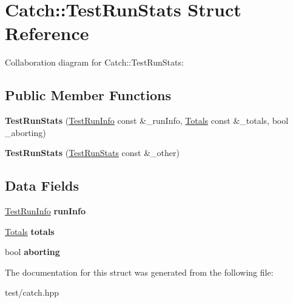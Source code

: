 \hypertarget{structCatch_1_1TestRunStats}{}\section{Catch\+:\+:Test\+Run\+Stats Struct Reference}
\label{structCatch_1_1TestRunStats}


Collaboration diagram for Catch\+:\+:Test\+Run\+Stats\+:
\subsection*{Public Member Functions}
\begin{DoxyCompactItemize}
\item 
{\bfseries Test\+Run\+Stats} (\hyperlink{structCatch_1_1TestRunInfo}{Test\+Run\+Info} const \&\+\_\+run\+Info, \hyperlink{structCatch_1_1Totals}{Totals} const \&\+\_\+totals, bool \+\_\+aborting)\hypertarget{structCatch_1_1TestRunStats_a3a9fc8c8bed1a73a340a909f5a8577fe}{}\label{structCatch_1_1TestRunStats_a3a9fc8c8bed1a73a340a909f5a8577fe}

\item 
{\bfseries Test\+Run\+Stats} (\hyperlink{structCatch_1_1TestRunStats}{Test\+Run\+Stats} const \&\+\_\+other)\hypertarget{structCatch_1_1TestRunStats_a62725661b161c79da2239d62d94fe20d}{}\label{structCatch_1_1TestRunStats_a62725661b161c79da2239d62d94fe20d}

\end{DoxyCompactItemize}
\subsection*{Data Fields}
\begin{DoxyCompactItemize}
\item 
\hyperlink{structCatch_1_1TestRunInfo}{Test\+Run\+Info} {\bfseries run\+Info}\hypertarget{structCatch_1_1TestRunStats_afc5a9d3cfd9b44a260f1def9c59d7f19}{}\label{structCatch_1_1TestRunStats_afc5a9d3cfd9b44a260f1def9c59d7f19}

\item 
\hyperlink{structCatch_1_1Totals}{Totals} {\bfseries totals}\hypertarget{structCatch_1_1TestRunStats_a4b5828873ebb7ea7c324503e2be1f985}{}\label{structCatch_1_1TestRunStats_a4b5828873ebb7ea7c324503e2be1f985}

\item 
bool {\bfseries aborting}\hypertarget{structCatch_1_1TestRunStats_a5782d67fe76b34f8fd5d476eb3eb2be7}{}\label{structCatch_1_1TestRunStats_a5782d67fe76b34f8fd5d476eb3eb2be7}

\end{DoxyCompactItemize}


The documentation for this struct was generated from the following file\+:\begin{DoxyCompactItemize}
\item 
test/catch.\+hpp\end{DoxyCompactItemize}
